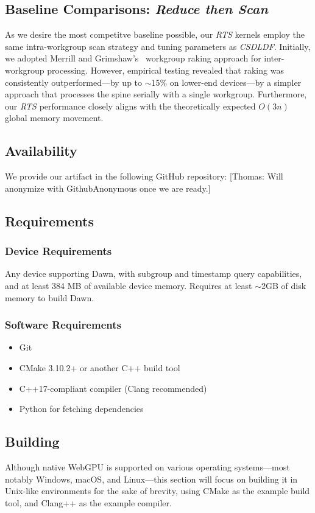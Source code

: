 \documentclass[sigconf]{acmart}
\newcommand{\thomas}[1]{{\footnotesize\color{orange}[Thomas: #1]}}
\begin{document}
\subsection{Baseline Comparisons: \emph{Reduce then Scan}}
\label{sec:rts}
As we desire the most competitve baseline possible, our \emph{RTS} kernels employ the same intra-workgroup scan strategy and tuning parameters as \emph{CSDLDF}. Initially, we adopted Merrill and Grimshaw's~\cite{Merrill2009} workgroup raking approach for inter-workgroup processing. However, empirical testing revealed that raking was consistently outperformed—by up to $\sim$15\% on lower-end devices—by a simpler approach that processes the spine serially with a single workgroup. Furthermore, our \emph{RTS} performance closely aligns with the theoretically expected $O(3n)$ global memory movement.

\subsection{Availability}
We provide our artifact in the following GitHub repository:
\thomas{Will anonymize with GithubAnonymous once we are ready.}

\subsection{Requirements}

\subsubsection{Device Requirements}
Any device supporting Dawn, with subgroup and timestamp query capabilities, and at least 384 MB of available device memory. Requires at least $\sim$2GB of disk memory to build Dawn.

\subsubsection{Software Requirements}
\begin{itemize}
  \item Git
  \item CMake 3.10.2+ or another C++ build tool
  \item C++17-compliant compiler (Clang recommended)
  \item Python for fetching dependencies
\end{itemize}

\subsection{Building}
Although native WebGPU is supported on various operating systems—most notably Windows, macOS, and Linux—this section will focus on building it in Unix-like environments for the sake of brevity, using CMake as the example build tool, and Clang++ as the example compiler.
\end{document}
